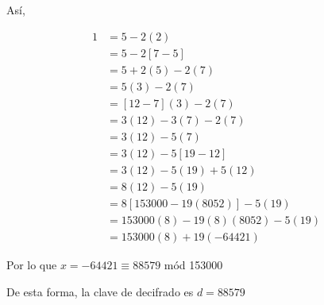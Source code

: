 \documentclass[12pt]{article}
\begin{document}
Así, 

\begin{equation}
    \begin{split}
        1 & = 5 - 2(2) \\
        & = 5 - 2[7 - 5] \\
        & = 5 + 2(5) -2(7) \\
        & = 5(3) - 2(7) \\
        & = [12 - 7](3) - 2(7) \\
        & = 3(12) - 3(7) - 2(7) \\ 
        & = 3(12) - 5(7) \\
        & = 3(12) - 5[19 - 12] \\
        & = 3(12) - 5(19) + 5(12) \\ 
        & = 8(12) - 5(19) \\
        & = 8[153000 - 19(8052)] - 5(19) \\  
        & = 153000(8) - 19(8)(8052) - 5(19) \\
        & = 153000(8) + 19(-64421)
    \end{split}
\end{equation}

Por lo que $x = -64421 \equiv 88579$ mód 153000

De esta forma, la clave de decifrado es $d = 88579$
\end{document}
